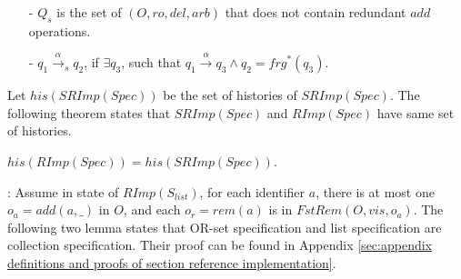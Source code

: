 \begin{itemize}
\setlength{\itemsep}{0.5pt}
\item[-] $Q_s$ is the set of $(O,\mathit{ro},\mathit{del},\mathit{arb})$ that does not contain redundant $\mathit{add}$ operations. %
\item[-] $q_1 {\xrightarrow{\alpha}}_s q_2$, if $\exists q_3$, such that $q_1 {\xrightarrow{\alpha}} q_3 \wedge q_2 = \mathit{frg}^*(q_3)$. %


\end{itemize}




{\color {red}Let $\mathit{his}(\mathit{SRImp}(\mathit{Spec}))$ be the set of histories of $\mathit{SRImp}(\mathit{Spec})$.} The following theorem states that $\mathit{SRImp}(\mathit{Spec})$ and $\mathit{RImp}(\mathit{Spec})$ have same set of histories.
\begin{theorem}
\label{theorem:SRIMPSpec and RIMPSpec have same history}
$\mathit{his}(\mathit{RImp}(\mathit{Spec})) = \mathit{his}(\mathit{SRImp}(\mathit{Spec}))$.
\end{theorem}

: {\color {red}Assume in state of $\mathit{RImp}(S_{\mathit{list}})$, for each identifier $a$, there is at most one $o_a = \mathit{add}(a,\_)$ in $O$, and each $o_r = \mathit{rem}(a)$ is in $\mathit{FstRem}(O,\mathit{vis},o_a)$. The following two lemma states that OR-set specification and list specification are collection specification. Their proof can be found in Appendix \ref{sec:appendix definitions and proofs of section reference implementation}.}



